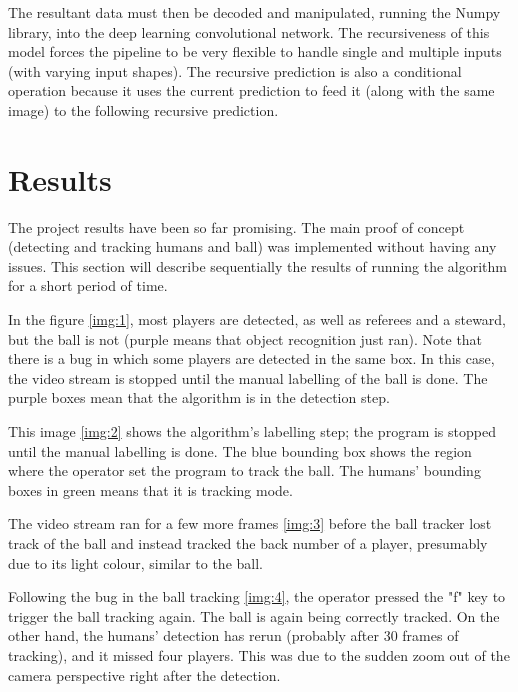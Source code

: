 \documentclass[
    11pt,
    oneside
]{report}
\begin{document}
The resultant data must then be decoded and manipulated, running the Numpy library, into the deep learning convolutional network. The recursiveness of this model forces the pipeline to be very flexible to handle single and multiple inputs (with varying input shapes). The recursive prediction is also a conditional operation because it uses the current prediction to feed it (along with the same image) to the following recursive prediction.



\section{Results}

The project results have been so far promising. The main proof of concept (detecting and tracking humans and ball) was implemented without having any issues. This section will describe sequentially the results of running the algorithm for a short period of time.



In the figure \ref{img:1}, most players are detected, as well as referees and a steward, but the ball is not (purple means that object recognition just ran). Note that there is a bug in which some players are detected in the same box. In this case, the video stream is stopped until the manual labelling of the ball is done. The purple boxes mean that the algorithm is in the detection step.



This image \ref{img:2} shows the algorithm's labelling step; the program is stopped until the manual labelling is done. The blue bounding box shows the region where the operator set the program to track the ball. The humans' bounding boxes in green means that it is tracking mode.



The video stream ran for a few more frames \ref{img:3} before the ball tracker lost track of the ball and instead tracked the back number of a player, presumably due to its light colour, similar to the ball.



Following the bug in the ball tracking \ref{img:4}, the operator pressed the "f" key to trigger the ball tracking again. The ball is again being correctly tracked. On the other hand, the humans' detection has rerun (probably after 30 frames of tracking), and it missed four players. This was due to the sudden zoom out of the camera perspective right after the detection.
\end{document}
